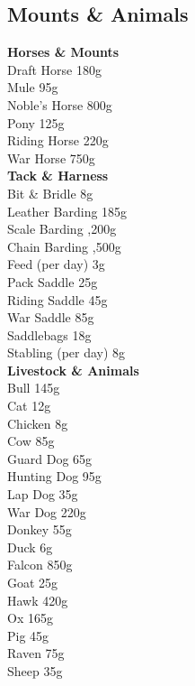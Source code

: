 \documentclass[10pt,twoside]{article}
\begin{document}
\subsection{Mounts \& Animals}

\begin{multicols}{2}
\textbf{Horses \& Mounts} \\
Draft Horse \dotfill 180g \\
Mule \dotfill 95g \\
Noble's Horse \dotfill 800g \\
Pony \dotfill 125g \\
Riding Horse \dotfill 220g \\
War Horse \dotfill 750g \\

\textbf{Tack \& Harness} \\
Bit \& Bridle \dotfill 8g \\
Leather Barding \dotfill 185g \\
Scale Barding ,200g \\
Chain Barding ,500g \\
Feed (per day) \dotfill 3g \\
Pack Saddle \dotfill 25g \\
Riding Saddle \dotfill 45g \\
War Saddle \dotfill 85g \\
Saddlebags \dotfill 18g \\
Stabling (per day) \dotfill 8g \\

\textbf{Livestock \& Animals} \\
Bull \dotfill 145g \\
Cat \dotfill 12g \\
Chicken \dotfill 8g \\
Cow \dotfill 85g \\
Guard Dog \dotfill 65g \\
Hunting Dog \dotfill 95g \\
Lap Dog \dotfill 35g \\
War Dog \dotfill 220g \\
Donkey \dotfill 55g \\
Duck \dotfill 6g \\
Falcon \dotfill 850g \\
Goat \dotfill 25g \\
Hawk \dotfill 420g \\
Ox \dotfill 165g \\
Pig \dotfill 45g \\
Raven \dotfill 75g \\
Sheep \dotfill 35g \\
\end{multicols}
\end{document}
